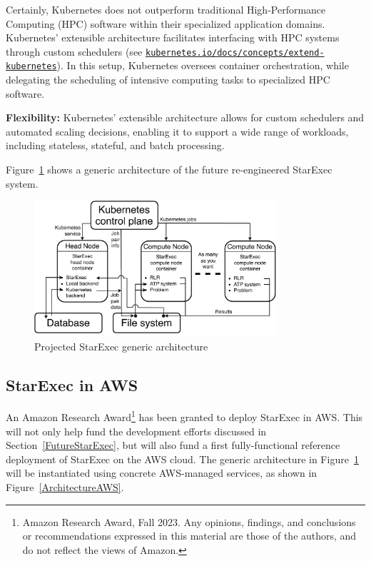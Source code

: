 \documentclass{easychair}
\newenvironment{packed_itemize}{
\vspace*{-0.3em}
\begin{itemize}
\setlength{\partopsep}{0pt}
\setlength{\itemsep}{1pt}
\setlength{\parskip}{0pt}
\setlength{\parsep}{0pt}
}{\end{itemize}}
\begin{document}
\begin{enumerate}
\begin{packed_itemize}
{		   Certainly, Kubernetes does not outperform traditional High-Performance Computing (HPC) 
           software within their specialized application domains. 
           Kubernetes' extensible architecture facilitates interfacing with HPC systems through 
           custom schedulers (see 
           \href{https://kubernetes.io/docs/concepts/extend-kubernetes/}{\tt kubernetes.io/docs/concepts/extend-kubernetes}). 
           In this setup, Kubernetes oversees container orchestration, while delegating the 
           scheduling of intensive computing tasks to specialized HPC software.}
	 \item \textbf{Flexibility:} Kubernetes' extensible architecture allows for custom schedulers 
           and automated scaling decisions, enabling it to support a wide range of workloads, 
           including stateless, stateful, and batch processing.
     \end{packed_itemize}
\end{enumerate}

Figure~\ref{ArchitectureK} shows a generic architecture of the future re-engineered StarExec 
system.

\begin{figure}[htb]
\begin{center}
\includegraphics[width=0.8\textwidth]{ArchitectureK}
\caption{Projected StarExec generic architecture}
\label{ArchitectureK}
\end{center}
\end{figure}

\subsection{StarExec in AWS}

An Amazon Research Award\footnote{%
Amazon Research Award, Fall 2023. Any opinions, findings, and conclusions or recommendations 
expressed in this material are those of the authors, and do not reflect the views of Amazon.} 
has been granted to deploy StarExec in AWS.
This will not only help fund the development efforts discussed in Section~\ref{FutureStarExec}, 
but will also fund a first fully-functional reference deployment of StarExec on the AWS cloud. 
The generic architecture in Figure~\ref{ArchitectureK} will be instantiated using concrete 
AWS-managed services, as shown in Figure~\ref{ArchitectureAWS}.
\end{document}
